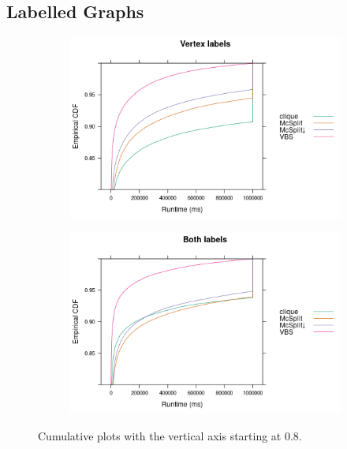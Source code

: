 \documentclass{l4proj}
\theoremstyle{definition}
\theoremstyle{remark}
\begin{document}
\subsection{Labelled Graphs} \label{sec:labelled_runtimes}

\begin{figure}
  \centering
  \begin{subfigure}[t]{0.49\textwidth}
    \centering
    \includegraphics[width=\textwidth]{images/ecdf_vertex_labels.png}
  \end{subfigure}
  \begin{subfigure}[t]{0.49\textwidth}
    \centering
    \includegraphics[width=\textwidth]{images/ecdf_both_labels.png}
  \end{subfigure}
  \caption{Cumulative plots with the vertical axis starting at 0.8.}
  \label{fig:ecdfs}
\end{figure}
\end{document}
